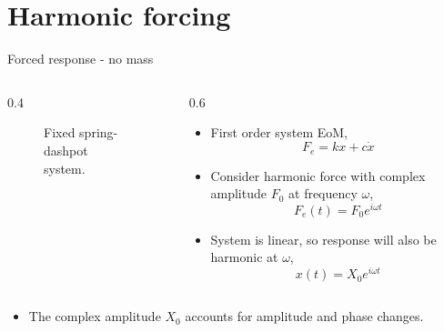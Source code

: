 \documentclass[11pt,aspectratio=169,handout]{beamer}
\begin{document}
\section{Harmonic forcing}
\begin{frame}[c]{Forced response - no mass}
	\begin{columns}[T]
		\begin{column}{0.4\textwidth}
			\begin{figure}
				\centering
				
				\caption{Fixed spring-dashpot system.}
			\end{figure}
		\end{column}
		\begin{column}{0.6\textwidth}			
			\begin{itemize}
				\item<1-> First order system EoM,
				\begin{equation}\label{}
					F_e = kx + c\dot{x}
				\end{equation}
				\item<1-> Consider harmonic force with complex amplitude $F_0$ at frequency $\omega$,
				\begin{equation}
					F_e(t) = F_0 e^{i\omega t}
				\end{equation}
				\item<2-> System is linear, so response will also be harmonic at $\omega$,
				\begin{equation}
					x(t) = X_0 e^{i\omega t}
				\end{equation}
			\end{itemize}
		\end{column}
		\end{columns}
			\begin{itemize}
				\item<3->  The complex amplitude $X_0$ accounts for amplitude and phase changes.
			\end{itemize}
\end{frame}
\end{document}
